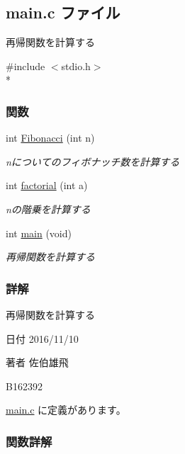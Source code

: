 \subsection{main.\-c ファイル}
\label{main_8c}


再帰関数を計算する  


{\ttfamily \#include $<$stdio.\-h$>$}\\*
\subsubsection*{関数}
\begin{DoxyCompactItemize}
\item 
int \hyperlink{main_8c_a759ae4b46839ee501ae5facb85046926}{Fibonacci} (int n)
\begin{DoxyCompactList}\small\item\em nについてのフィボナッチ数を計算する \end{DoxyCompactList}\item 
int \hyperlink{main_8c_a5127a26373d94a3e3d4c46eca1e20cb7}{factorial} (int a)
\begin{DoxyCompactList}\small\item\em nの階乗を計算する \end{DoxyCompactList}\item 
int \hyperlink{main_8c_a840291bc02cba5474a4cb46a9b9566fe}{main} (void)
\begin{DoxyCompactList}\small\item\em 再帰関数を計算する \end{DoxyCompactList}\end{DoxyCompactItemize}


\subsubsection{詳解}
再帰関数を計算する \begin{DoxyDate}{日付}
2016/11/10 
\end{DoxyDate}
\begin{DoxyAuthor}{著者}
佐伯雄飛 

B162392 
\end{DoxyAuthor}


 \hyperlink{main_8c_source}{main.\-c} に定義があります。



\subsubsection{関数詳解}
